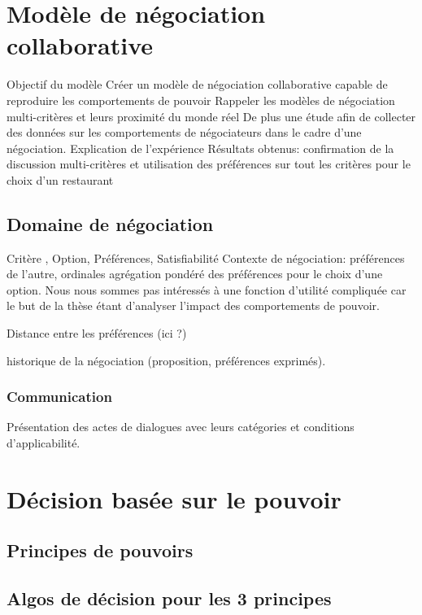 \documentclass [french]{article}
\begin{document}
	

		
	\section{Modèle de négociation collaborative}
			Objectif du modèle 
			Créer un modèle de négociation collaborative capable de reproduire les comportements de pouvoir
			Rappeler les modèles de négociation multi-critères et leurs proximité du monde réel
			De plus une étude afin de collecter des données sur les comportements de négociateurs dans le cadre d'une négociation.
				Explication de l'expérience
				Résultats obtenus: confirmation de la discussion multi-critères et utilisation des préférences  sur tout les critères pour le choix d'un restaurant
			
			\subsection{Domaine de négociation }
				 Critère , Option, Préférences, Satisfiabilité
				Contexte de négociation: préférences de l'autre, ordinales
				agrégation pondéré des préférences pour le choix d'une option. Nous nous sommes pas intéressés à une fonction d'utilité compliquée car le but de la thèse étant d'analyser l'impact des comportements de pouvoir.
				
				Distance entre les préférences (ici ?)
				
				historique de la négociation (proposition, préférences exprimés).
				
			
		
			\subsubsection{Communication}
			 Présentation des actes de dialogues avec leurs catégories et conditions d'applicabilité. 
			
			 
			 


		\section{Décision basée sur le pouvoir}
			
			\subsection{Principes de pouvoirs }
			
			\subsection{Algos de décision pour les 3 principes}
			
\end{document}
